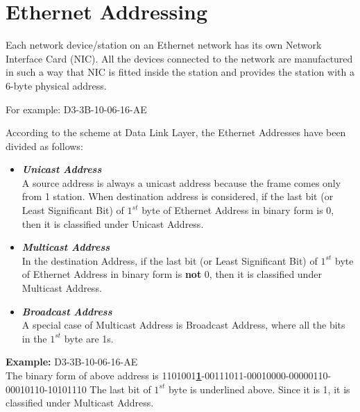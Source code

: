 \documentclass[12pt]{article}
\begin{document}
\section{Ethernet Addressing}

Each network device/station on an Ethernet network has its own Network Interface Card (NIC). All the devices connected to the network are manufactured in such a way that NIC is fitted inside the station and provides the station with a 6-byte physical address.

For example: D3-3B-10-06-16-AE

According to the scheme at Data Link Layer, the Ethernet Addresses have been divided as follows:
\begin{itemize}
    \item \textbf{\textit{Unicast Address}} \\
        A source address is always a unicast address because the frame comes only from 1 station. When destination address is considered, if the last bit (or Least Significant Bit) of $1^{st}$ byte of Ethernet Address in binary form is 0, then it is classified under Unicast Address.
    \item \textbf{\textit{Multicast Address}} \\    
        In the destination Address, if the last bit (or Least Significant Bit) of $1^{st}$ byte of Ethernet Address in binary form is \textbf{not} 0, then it is classified under Multicast Address.
    \item \textbf{\textit{Broadcast Address}} \\
        A special case of Multicast Address is Broadcast Address, where all the bits in the $1^{st}$ byte are 1s.
\end{itemize}
\textbf{Example:} D3-3B-10-06-16-AE \\
The binary form of above address is 1101001\textbf{\underline{1}}-00111011-00010000-00000110-00010110-10101110
The last bit of $1^{st}$ byte is underlined above. Since it is 1, it is classified under Multicast Address.

\end{document}
